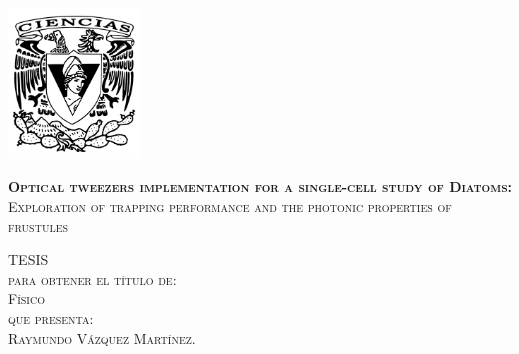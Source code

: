 \documentclass[letterpaper,12pt,oneside]{book}
\begin{document}
\begin{titlepage}
        \begin{minipage}[c][0.81\textheight][t]{0.25\textwidth}
            \vspace*{5mm}
            \begin{center}
                \hskip2.0mm
                \vrule width1pt height13cm 
                \vspace{5mm}
                \hskip2pt
                \vrule width2.5pt height13cm
                \hskip2mm
                \vrule width1pt height13cm \\
                \vspace{5mm}
                \includegraphics[height=4.0cm]{Escudos/Escudo-FCIENCIAS.pdf}
            \end{center}
        \end{minipage}
        \begin{minipage}[c][0.81\textheight][t]{0.75\textwidth}
            \begin{center}
                \vspace{1cm}

                {\large\scshape  %
\textbf{Optical tweezers implementation for a single-cell study of Diatoms:} \\[0.5em]
{\small Exploration of trapping performance and the photonic properties of frustules}
                \vspace{2cm}            
                
                \textsc{\LARGE T\hspace{1.5cm}E\hspace{1.5cm}S\hspace{1.5cm}I\hspace{1.5cm}S}\\[0.5cm]
                \textsc{\large para obtener el t\'itulo de:}\\[0.5cm]
                \textsc{\large Físico}\\[0.5cm]
                \textsc{\large que presenta:}\\[0.5cm]
                \textsc{\large {Raymundo Vázquez Martínez.}}\\[2cm]          

}
\end{center}
\end{minipage}
\end{titlepage}
\end{document}
